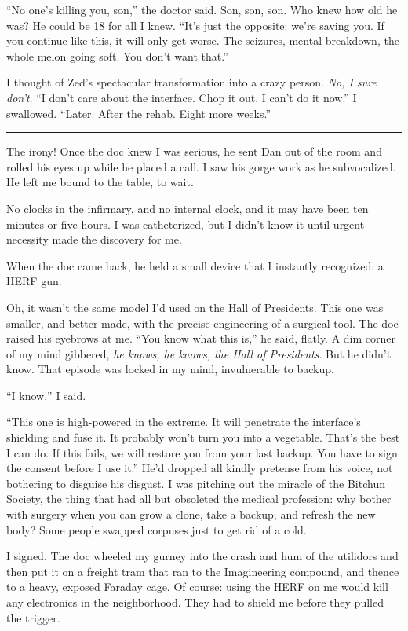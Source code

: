 “No one's killing you, son,” the doctor said. Son, son, son. Who
knew how old he was? He could be 18 for all I knew. “It's just the
opposite: we're saving you. If you continue like this, it will only
get worse. The seizures, mental breakdown, the whole melon going
soft. You don't want that.”

I thought of Zed's spectacular transformation into a crazy person.
\emph{No, I sure don't}. “I don't care about the interface. Chop it
out. I can't do it now.” I swallowed. “Later. After the rehab.
Eight more weeks.”

\begin{center}\rule{3in}{0.4pt}\end{center}

The irony! Once the doc knew I was serious, he sent Dan out of the
room and rolled his eyes up while he placed a call. I saw his gorge
work as he subvocalized. He left me bound to the table, to wait.

No clocks in the infirmary, and no internal clock, and it may have
been ten minutes or five hours. I was catheterized, but I didn't
know it until urgent necessity made the discovery for me.

When the doc came back, he held a small device that I instantly
recognized: a HERF gun.

Oh, it wasn't the same model I'd used on the Hall of Presidents.
This one was smaller, and better made, with the precise engineering
of a surgical tool. The doc raised his eyebrows at me. “You know
what this is,” he said, flatly. A dim corner of my mind gibbered,
\emph{he knows, he knows, the Hall of Presidents}. But he didn't
know. That episode was locked in my mind, invulnerable to backup.

“I know,” I said.

“This one is high-powered in the extreme. It will penetrate the
interface's shielding and fuse it. It probably won't turn you into
a vegetable. That's the best I can do. If this fails, we will
restore you from your last backup. You have to sign the consent
before I use it.” He'd dropped all kindly pretense from his voice,
not bothering to disguise his disgust. I was pitching out the
miracle of the Bitchun Society, the thing that had all but
obsoleted the medical profession: why bother with surgery when you
can grow a clone, take a backup, and refresh the new body? Some
people swapped corpuses just to get rid of a cold.

I signed. The doc wheeled my gurney into the crash and hum of the
utilidors and then put it on a freight tram that ran to the
Imagineering compound, and thence to a heavy, exposed Faraday cage.
Of course: using the HERF on me would kill any electronics in the
neighborhood. They had to shield me before they pulled the
trigger.


